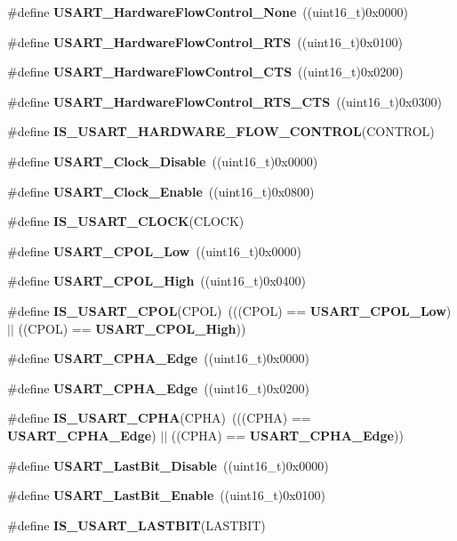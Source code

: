 \begin{DoxyCompactItemize}
\item 
\#define \textbf{ U\+S\+A\+R\+T\+\_\+\+Hardware\+Flow\+Control\+\_\+\+None}~((uint16\+\_\+t)0x0000)
\item 
\#define \textbf{ U\+S\+A\+R\+T\+\_\+\+Hardware\+Flow\+Control\+\_\+\+R\+TS}~((uint16\+\_\+t)0x0100)
\item 
\#define \textbf{ U\+S\+A\+R\+T\+\_\+\+Hardware\+Flow\+Control\+\_\+\+C\+TS}~((uint16\+\_\+t)0x0200)
\item 
\#define \textbf{ U\+S\+A\+R\+T\+\_\+\+Hardware\+Flow\+Control\+\_\+\+R\+T\+S\+\_\+\+C\+TS}~((uint16\+\_\+t)0x0300)
\item 
\#define \textbf{ I\+S\+\_\+\+U\+S\+A\+R\+T\+\_\+\+H\+A\+R\+D\+W\+A\+R\+E\+\_\+\+F\+L\+O\+W\+\_\+\+C\+O\+N\+T\+R\+OL}(C\+O\+N\+T\+R\+OL)
\item 
\#define \textbf{ U\+S\+A\+R\+T\+\_\+\+Clock\+\_\+\+Disable}~((uint16\+\_\+t)0x0000)
\item 
\#define \textbf{ U\+S\+A\+R\+T\+\_\+\+Clock\+\_\+\+Enable}~((uint16\+\_\+t)0x0800)
\item 
\#define \textbf{ I\+S\+\_\+\+U\+S\+A\+R\+T\+\_\+\+C\+L\+O\+CK}(C\+L\+O\+CK)
\item 
\#define \textbf{ U\+S\+A\+R\+T\+\_\+\+C\+P\+O\+L\+\_\+\+Low}~((uint16\+\_\+t)0x0000)
\item 
\#define \textbf{ U\+S\+A\+R\+T\+\_\+\+C\+P\+O\+L\+\_\+\+High}~((uint16\+\_\+t)0x0400)
\item 
\#define \textbf{ I\+S\+\_\+\+U\+S\+A\+R\+T\+\_\+\+C\+P\+OL}(C\+P\+OL)~(((C\+P\+OL) == \textbf{ U\+S\+A\+R\+T\+\_\+\+C\+P\+O\+L\+\_\+\+Low}) $\vert$$\vert$ ((C\+P\+OL) == \textbf{ U\+S\+A\+R\+T\+\_\+\+C\+P\+O\+L\+\_\+\+High}))
\item 
\#define \textbf{ U\+S\+A\+R\+T\+\_\+\+C\+P\+H\+A\+\_\+Edge}~((uint16\+\_\+t)0x0000)
\item 
\#define \textbf{ U\+S\+A\+R\+T\+\_\+\+C\+P\+H\+A\+\_\+Edge}~((uint16\+\_\+t)0x0200)
\item 
\#define \textbf{ I\+S\+\_\+\+U\+S\+A\+R\+T\+\_\+\+C\+P\+HA}(C\+P\+HA)~(((C\+P\+HA) == \textbf{ U\+S\+A\+R\+T\+\_\+\+C\+P\+H\+A\+\_\+Edge}) $\vert$$\vert$ ((C\+P\+HA) == \textbf{ U\+S\+A\+R\+T\+\_\+\+C\+P\+H\+A\+\_\+Edge}))
\item 
\#define \textbf{ U\+S\+A\+R\+T\+\_\+\+Last\+Bit\+\_\+\+Disable}~((uint16\+\_\+t)0x0000)
\item 
\#define \textbf{ U\+S\+A\+R\+T\+\_\+\+Last\+Bit\+\_\+\+Enable}~((uint16\+\_\+t)0x0100)
\item 
\#define \textbf{ I\+S\+\_\+\+U\+S\+A\+R\+T\+\_\+\+L\+A\+S\+T\+B\+IT}(L\+A\+S\+T\+B\+IT)

\end{DoxyCompactItemize}
